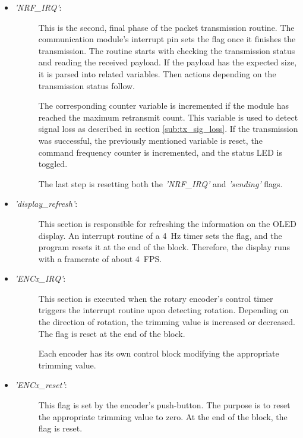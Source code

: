 \begin{itemize}
	\item \begin{description}
\item[\textit{'NRF\_IRQ'}:]
This is the second, final phase of the packet transmission routine. The communication module's interrupt pin sets the flag once it finishes the transmission. The routine starts with checking the transmission status and reading the received payload. If the payload has the expected size, it is parsed into related variables. Then actions depending on the transmission status follow.

The corresponding counter variable is incremented if the module has reached the maximum retransmit count. This variable is used to detect signal loss as described in section \ref{sub:tx_sig_loss}. If the transmission was successful, the previously mentioned variable is reset, the command frequency counter is incremented, and the status LED is toggled.

The last step is resetting both the \textit{'NRF\_IRQ'} and \textit{'sending'} flags.
\end{description}

	\item \begin{description}
\item[\textit{'display\_refresh'}:]
This section is responsible for refreshing the information on the OLED display. An interrupt routine of a \SI{4}{\Hz} timer sets the flag, and the program resets it at the end of the block. Therefore, the display runs with a framerate of about \SI{4}{FPS}.
\end{description}

	\item \begin{description}
\item[\textit{'ENCx\_IRQ'}:]
This section is executed when the rotary encoder's control timer triggers the interrupt routine upon detecting rotation. Depending on the direction of rotation, the trimming value is increased or decreased. The flag is reset at the end of the block.

Each encoder has its own control block modifying the appropriate trimming value.
\end{description}

	\item \begin{description}
\item[\textit{'ENCx\_reset'}:]
This flag is set by the encoder's push-button. The purpose is to reset the appropriate trimming value to zero. At the end of the block, the flag is reset.
\end{description}

\end{itemize}


